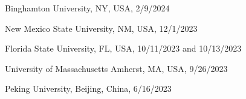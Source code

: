 \documentclass[11pt,letter]{article}
\renewenvironment{itemize}{
  \begin{list}{}{
    \setlength{\leftmargin}{1.5em}
    \setlength{\itemsep}{0.25em}
    \setlength{\parskip}{0pt}
    \setlength{\parsep}{0.25em}
  }
}{
  \end{list}
}
\begin{document}
\begin{itemize}

% 


\item Binghamton University, NY, USA, 2/9/2024


\item New Mexico State University, NM, USA, 12/1/2023

\item Florida State University, FL, USA, 10/11/2023 and 10/13/2023
%
%
 
\item University of Massachusetts Amherst, MA, USA, 9/26/2023

\item
%
%
Peking University, Beijing, China, 6/16/2023


\end{itemize}
\end{document}
